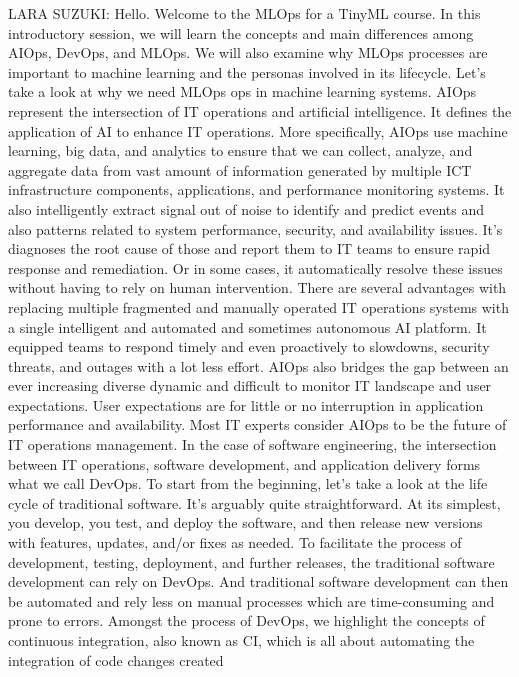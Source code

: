 LARA SUZUKI: Hello.
Welcome to the MLOps for a TinyML course.
In this introductory session, we will learn the concepts and main differences
among AIOps, DevOps, and MLOps.
We will also examine why MLOps processes are
important to machine learning and the personas involved in its lifecycle.
Let's take a look at why we need MLOps ops in machine learning systems.
AIOps represent the intersection of IT operations and artificial intelligence.
It defines the application of AI to enhance IT operations.
More specifically, AIOps use machine learning, big data, and analytics
to ensure that we can collect, analyze, and aggregate data from vast amount
of information generated by multiple ICT infrastructure
components, applications, and performance monitoring systems.
It also intelligently extract signal out of noise to identify and predict events
and also patterns related to system performance, security,
and availability issues.
It's diagnoses the root cause of those and report
them to IT teams to ensure rapid response and remediation.
Or in some cases, it automatically resolve these issues
without having to rely on human intervention.
There are several advantages with replacing multiple fragmented
and manually operated IT operations systems
with a single intelligent and automated and sometimes autonomous AI platform.
It equipped teams to respond timely and even
proactively to slowdowns, security threats, and outages
with a lot less effort.
AIOps also bridges the gap between an ever increasing diverse dynamic
and difficult to monitor IT landscape and user expectations.
User expectations are for little or no interruption in application performance
and availability.
Most IT experts consider AIOps to be the future of IT operations management.
In the case of software engineering, the intersection
between IT operations, software development, and application delivery
forms what we call DevOps.
To start from the beginning, let's take a look
at the life cycle of traditional software.
It's arguably quite straightforward.
At its simplest, you develop, you test, and deploy the software,
and then release new versions with features, updates, and/or
fixes as needed.
To facilitate the process of development, testing, deployment,
and further releases, the traditional software development
can rely on DevOps.
And traditional software development can then
be automated and rely less on manual processes which
are time-consuming and prone to errors.
Amongst the process of DevOps, we highlight the concepts
of continuous integration, also known as CI,
which is all about automating the integration of code changes created
